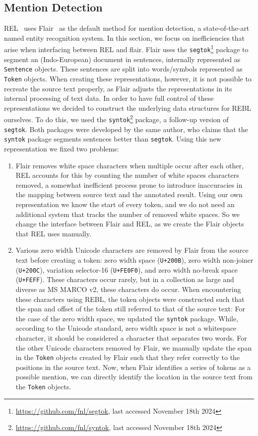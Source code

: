 \subsection{Mention Detection}
REL~\citep{rel} uses Flair~\citep{flair} as the default method for mention detection, a state-of-the-art named entity recognition system.
In this section, we focus on inefficiencies that arise when interfacing between REL and flair. 
Flair uses the \texttt{segtok}\footnote{\url{https://github.com/fnl/segtok}, last accessed November 18th 2024} package to segment an (Indo-European) document in sentences, internally represented as \texttt{Sentence} objects. These sentences are split into words/symbols represented as \texttt{Token} objects.
When creating these representations, however, it is not possible to recreate the source text properly, as 
Flair adjusts the representations in its internal processing of text data. In order to have full control of these representations we decided to  construct the underlying data structures for REBL ourselves. To do this, we used the \texttt{syntok}\footnote{\url{https://github.com/fnl/syntok}, last accessed November 18th 2024} package, a follow-up version of \texttt{segtok}.
Both packages were developed by the same author, who claims that the \texttt{syntok} package segments sentences better than \texttt{segtok}. 
Using this new representation we fixed two problems: 
\begin{enumerate}
	\item Flair removes white space characters when multiple occur after each other, REL accounts for this by counting the number of white spaces characters removed, a somewhat inefficient process prone to introduce inaccuracies in the mapping between source text and the annotated result. Using our own representation we know the start of every token, and we do not need an additional system that tracks the number of removed white spaces. So we change the interface between Flair and REL, as we create the Flair objects that REL uses manually. 
	\item Various zero width Unicode characters are removed by Flair from the source text before creating a token: zero width space (\texttt{U+200B}), zero width non-joiner (\texttt{U+200C}), variation selector-16 (\texttt{U+FE0F0}), and zero width no-break space (\texttt{U+FEFF}). 
	These characters occur rarely, but in a collection as large and diverse as MS MARCO v2, these characters do occur. When encountering these characters using REBL, the token objects were constructed such that the span and offset of the token still referred to that of the source text:
	For the case of the zero width space, we updated the \texttt{syntok} package. While, according to the Unicode standard, zero width space is not a whitespace character, it should be considered a character that separates two words. For the other Unicode characters removed by Flair, we manually update the span in the \texttt{Token} objects created by Flair such that they refer correctly to the positions in the source text. Now, when Flair identifies a series of tokens as a possible mention, we can directly identify the location in the source text from the \texttt{Token} objects.
\end{enumerate}

